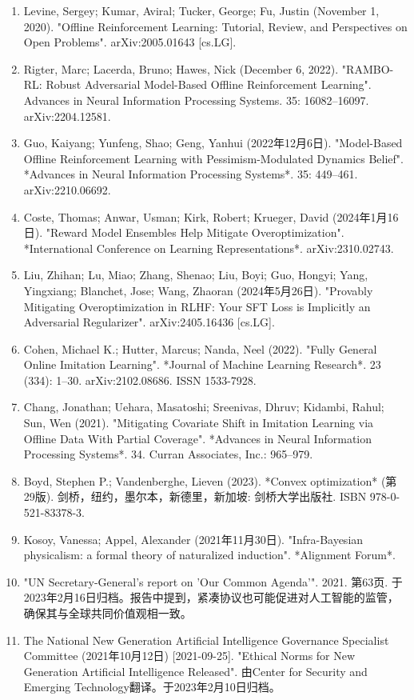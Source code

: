 \begin{enumerate}
\item Levine, Sergey; Kumar, Aviral; Tucker, George; Fu, Justin (November 1, 2020). "Offline Reinforcement Learning: Tutorial, Review, and Perspectives on Open Problems". arXiv:2005.01643 [cs.LG].
\item Rigter, Marc; Lacerda, Bruno; Hawes, Nick (December 6, 2022). "RAMBO-RL: Robust Adversarial Model-Based Offline Reinforcement Learning". Advances in Neural Information Processing Systems. 35: 16082–16097. arXiv:2204.12581.
\item Guo, Kaiyang; Yunfeng, Shao; Geng, Yanhui (2022年12月6日). "Model-Based Offline Reinforcement Learning with Pessimism-Modulated Dynamics Belief". *Advances in Neural Information Processing Systems*. 35: 449–461. arXiv:2210.06692.
\item Coste, Thomas; Anwar, Usman; Kirk, Robert; Krueger, David (2024年1月16日). "Reward Model Ensembles Help Mitigate Overoptimization". *International Conference on Learning Representations*. arXiv:2310.02743.
\item Liu, Zhihan; Lu, Miao; Zhang, Shenao; Liu, Boyi; Guo, Hongyi; Yang, Yingxiang; Blanchet, Jose; Wang, Zhaoran (2024年5月26日). "Provably Mitigating Overoptimization in RLHF: Your SFT Loss is Implicitly an Adversarial Regularizer". arXiv:2405.16436 [cs.LG].
\item Cohen, Michael K.; Hutter, Marcus; Nanda, Neel (2022). "Fully General Online Imitation Learning". *Journal of Machine Learning Research*. 23 (334): 1–30. arXiv:2102.08686. ISSN 1533-7928.
\item Chang, Jonathan; Uehara, Masatoshi; Sreenivas, Dhruv; Kidambi, Rahul; Sun, Wen (2021). "Mitigating Covariate Shift in Imitation Learning via Offline Data With Partial Coverage". *Advances in Neural Information Processing Systems*. 34. Curran Associates, Inc.: 965–979.
\item Boyd, Stephen P.; Vandenberghe, Lieven (2023). *Convex optimization* (第29版). 剑桥，纽约，墨尔本，新德里，新加坡: 剑桥大学出版社. ISBN 978-0-521-83378-3.
\item Kosoy, Vanessa; Appel, Alexander (2021年11月30日). "Infra-Bayesian physicalism: a formal theory of naturalized induction". *Alignment Forum*.
\item "UN Secretary-General's report on 'Our Common Agenda'". 2021. 第63页. 于2023年2月16日归档。报告中提到，紧凑协议也可能促进对人工智能的监管，确保其与全球共同价值观相一致。
\item The National New Generation Artificial Intelligence Governance Specialist Committee (2021年10月12日) [2021-09-25]. "Ethical Norms for New Generation Artificial Intelligence Released". 由Center for Security and Emerging Technology翻译。于2023年2月10日归档。

\end{enumerate}
